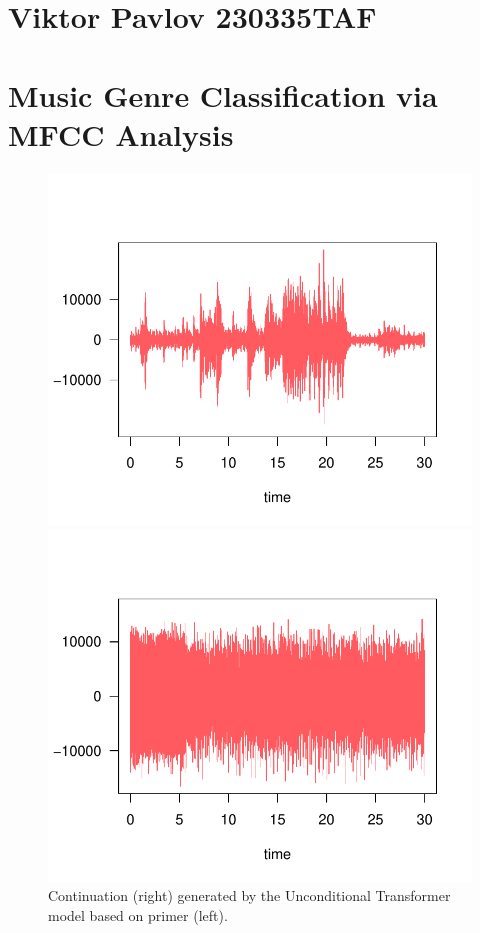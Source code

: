 \documentclass[twocolumn]{article}
\author{Name Surname }
\begin{document}
\section*{Viktor Pavlov 230335TAF}
\section{Music Genre Classification via MFCC Analysis}
\begin{figure}[htbp]
  \centering
  \begin{minipage}[t]{0.5\columnwidth}
    \centering
    \includegraphics[width=\linewidth]{images/audio_jazz.pdf}
  \end{minipage}\hfill
  \begin{minipage}[t]{0.5\columnwidth}
    \centering
    \includegraphics[width=\linewidth]{images/audio_metal.pdf}
  \end{minipage}
  \caption{Continuation (right) generated by the Unconditional Transformer model based on primer (left).}
  \label{fig:groupedImages}
\end{figure}
\blindtext
\end{document}
